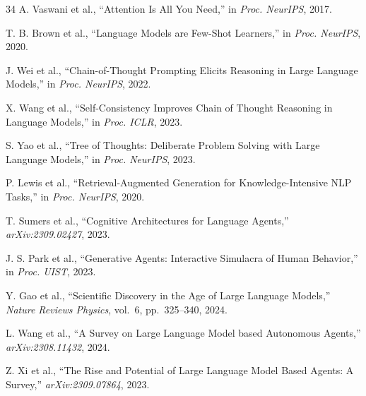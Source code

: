 \documentclass[review]{elsarticle}
\begin{document}
\begin{thebibliography}{34}
A. Vaswani et al., ``Attention Is All You Need,'' in \textit{Proc. NeurIPS}, 2017.

T. B. Brown et al., ``Language Models are Few-Shot Learners,'' in \textit{Proc. NeurIPS}, 2020.

J. Wei et al., ``Chain-of-Thought Prompting Elicits Reasoning in Large Language Models,'' in \textit{Proc. NeurIPS}, 2022.

X. Wang et al., ``Self-Consistency Improves Chain of Thought Reasoning in Language Models,'' in \textit{Proc. ICLR}, 2023.

S. Yao et al., ``Tree of Thoughts: Deliberate Problem Solving with Large Language Models,'' in \textit{Proc. NeurIPS}, 2023.

P. Lewis et al., ``Retrieval-Augmented Generation for Knowledge-Intensive NLP Tasks,'' in \textit{Proc. NeurIPS}, 2020.

T. Sumers et al., ``Cognitive Architectures for Language Agents,'' \textit{arXiv:2309.02427}, 2023.

J. S. Park et al., ``Generative Agents: Interactive Simulacra of Human Behavior,'' in \textit{Proc. UIST}, 2023.

Y. Gao et al., ``Scientific Discovery in the Age of Large Language Models,'' \textit{Nature Reviews Physics}, vol.~6, pp.~325--340, 2024.

L. Wang et al., ``A Survey on Large Language Model based Autonomous Agents,'' \textit{arXiv:2308.11432}, 2024.

Z. Xi et al., ``The Rise and Potential of Large Language Model Based Agents: A Survey,'' \textit{arXiv:2309.07864}, 2023.

\end{thebibliography}
\end{document}
